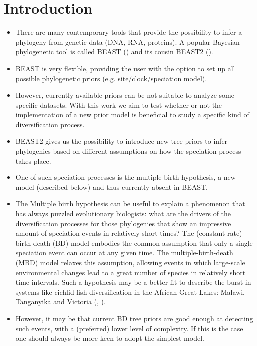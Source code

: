\section{Introduction}
\begin{itemize}

\item There are many contemporary tools that provide the possibility 
to infer a phylogeny from genetic data (DNA, RNA, proteins). 
A popular Bayesian phylogenetic tool is called BEAST (\cite{beast}) 
and its cousin BEAST2 (\cite{beast2}).

\item BEAST is very flexible, providing the user with the option 
to set up all possible phylogenetic priors (e.g. site/clock/speciation model).

\item However, currently available priors can be not suitable 
to analyze some specific datasets. 
With this work we aim to test whether or not 
the implementation of a new prior model 
is beneficial to study a specific kind of diversification process.

\item BEAST2 gives us the possibility to introduce new tree priors 
to infer phylogenies based on different assumptions 
on how the speciation process takes place.

\item One of such speciation processes is the multiple birth hypothesis,
a new model (described below) and thus currently absent in BEAST.

\item The Multiple birth hypothesis can be useful to explain a phenomenon 
that has always puzzled evolutionary biologists: 
what are the drivers of the diversification processes 
for those phylogenies that show an impressive amount of speciation events 
in relatively short times? 
The (constant-rate) birth-death (BD) model embodies the common assumption that 
only a single speciation event can occur at any given time.
The multiple-birth-death (MBD) model 
relaxes this assumption, allowing events in which 
large-scale environmental changes lead to a great number of species 
in relatively short time intervals. 
Such a hypothesis may be a better fit to describe the burst in systems 
like cichlid fish diversification in the 
African Great Lakes: Malawi, Tanganyika and Victoria 
(\cite{janzen2016}, \cite{janzen2017}).

\item However, it may be that current BD tree priors are good enough 
at detecting such events, with a (preferred) lower level of complexity. 
If this is the case one should always be more keen to adopt the simplest model.


\end{itemize}
